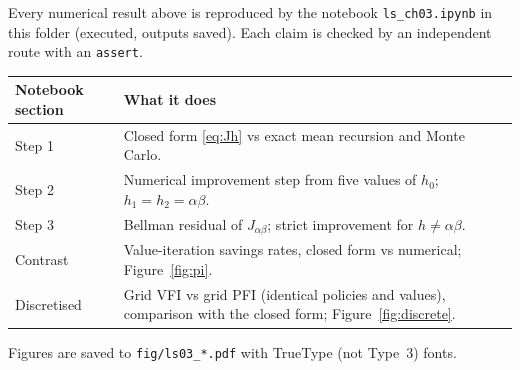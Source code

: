 \documentclass[12pt, letterpaper]{article}
\begin{document}
Every numerical result above is reproduced by the notebook \texttt{ls\_ch03.ipynb} in this folder
(executed, outputs saved). Each claim is checked by an independent route with an \texttt{assert}.

\begin{center}
\begin{tabular}{@{}lp{10.2cm}@{}}
\toprule
\textbf{Notebook section} & \textbf{What it does} \\
\midrule
Step 1 & Closed form \eqref{eq:Jh} vs exact mean recursion and Monte Carlo. \\
Step 2 & Numerical improvement step from five values of $h_0$; $h_1=h_2=\alpha\beta$. \\
Step 3 & Bellman residual of $J_{\alpha\beta}$; strict improvement for $h\neq\alpha\beta$. \\
Contrast & Value-iteration savings rates, closed form vs numerical; Figure~\ref{fig:pi}. \\
Discretised & Grid VFI vs grid PFI (identical policies and values), comparison with the
closed form; Figure~\ref{fig:discrete}. \\
\bottomrule
\end{tabular}
\end{center}

Figures are saved to \texttt{fig/ls03\_*.pdf} with TrueType (not Type~3) fonts.
\end{document}
